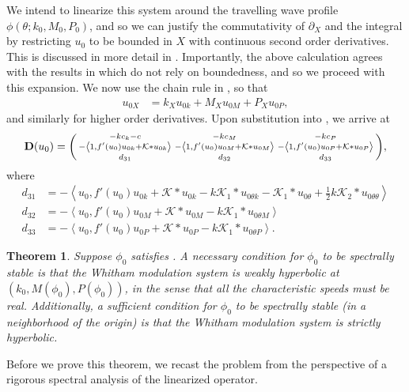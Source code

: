 \documentclass[11pt,leqno]{article}
\numberwithin{equation}{section}
\newcommand\LA{\left\langle}
\newcommand\RA{\right\rangle}
\newtheorem{theorem}{Theorem}[section]
\theoremstyle{definition}
\begin{document}
We intend to linearize this system around the travelling wave profile $ \phi(\theta;k_{0},M_{0},P_{0}) $, and so we can justify the commutativity of $ \partial_{X} $ and the integral by restricting $ u_{0} $ to be bounded in $ X $ with continuous second order derivatives. This is discussed in more detail in . Importantly, the above calculation agrees with the results in  which do not rely on boundedness, and so we proceed with this expansion. We now use the chain rule in , so that
\begin{align*}
	u_{0X} &= k_{X}u_{0k} + M_{X}u_{0M} + P_{X}u_{0P},
\end{align*}
and similarly for higher order derivatives. Upon substitution into , we arrive at
\begin{align}
	{\bf D}(u_{0}) = \begin{psmallmatrix}
		-kc_k - c & -kc_M & -kc_P \\
		-\LA 1,f'(u_{0})u_{0k} + \mathcal{K}*u_{0k}\RA & -\LA 1,f'(u_{0})u_{0M} + \mathcal{K}*u_{0M}\RA & -\LA 1,f'(u_{0})u_{0P} + \mathcal{K}*u_{0P}\RA \\
		 d_{31} & d_{32} & d_{33}
	\end{psmallmatrix},\label{eq:WhithamMatrix}
\end{align}
where
\begin{align*}
	d_{31} &= -\LA u_{0}, f'(u_{0})u_{0k} + \mathcal{K}*u_{0k} - k\mathcal{K}_{1}*u_{0\theta k} - \mathcal{K}_{1}*u_{0\theta} + \frac{1}{2}k\mathcal{K}_{2}*u_{0\theta\theta}\RA\\
	d_{32} &= -\LA u_{0}, f'(u_{0})u_{0M} + \mathcal{K}*u_{0M} - k\mathcal{K}_{1}*u_{0\theta M}\RA\\
	d_{33} &= -\LA u_{0}, f'(u_{0})u_{0P} + \mathcal{K}*u_{0P} - k\mathcal{K}_{1}*u_{0\theta P}\RA.
\end{align*}
\begin{theorem}\label{T:main}
Suppose $\phi_0$ satisfies .  
A necessary condition for $\phi_0$ to be spectrally stable is that the Whitham modulation system is weakly hyperbolic at $(k_0, M(\phi_0), P(\phi_0))$, in the sense that all the characteristic speeds must be real.  Additionally, a sufficient condition for $\phi_0$ to be spectrally stable (in a neighborhood of the origin) is that the Whitham modulation system is strictly hyperbolic.
\end{theorem}
Before we prove this theorem, we recast the problem from the perspective of a rigorous spectral analysis of the linearized operator.
\end{document}
